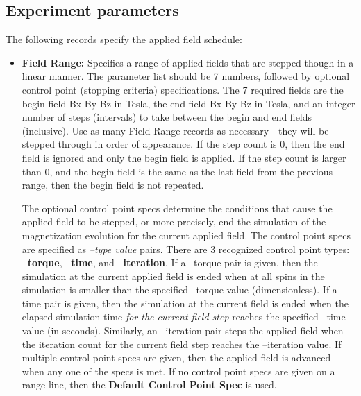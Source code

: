 \subsection{Experiment parameters}\label{sec:expparams}
The following records specify the applied field schedule:
\begin{itemize}
   \item {\bf Field Range:} Specifies a range of
      applied fields that are stepped though in a linear manner.  The
      parameter list should be 7 numbers, followed by optional control
      point (stopping criteria) specifications.  The 7 required fields
      are the begin field Bx By Bz in Tesla, the end field Bx By Bz in
      Tesla, and an integer number of steps (intervals) to take between
      the begin and end fields (inclusive).  Use as many Field Range
      records as necessary---they will be stepped through in order of
      appearance.  If the step count is 0, then the end field is ignored
      and only the begin field is applied.  If the step count is larger
      than 0, and the begin field is the same as the last field from the
      previous range, then the begin field is not repeated.

      The optional control point specs
      determine the conditions that cause the applied field to be
      stepped, or more precisely, end the simulation of the
      magnetization evolution for the current applied field.  The
      control point specs are specified as {\em --type value} pairs.
      There are 3 recognized control point types:
      {\bf --torque},
      {\bf --time}, and
      {\bf --iteration}.  If a --torque pair
      is given, then the simulation at the current applied field is
      ended when {} {} at all spins in the simulation is
      smaller than the specified --torque value (dimensionless).  If a
      --time pair is given, then the simulation at the current field is
      ended when the elapsed simulation time {\em for the current field
      step} reaches the specified --time value (in seconds).  Similarly,
      an --iteration pair steps the applied field when the iteration
      count for the current field step reaches the --iteration value.
      If multiple control point specs are given, then the applied field
      is advanced when any one of the specs is met.  If no control point
      specs are given on a range line, then the {\bf Default Control
      Point Spec} is used.


\end{itemize}

